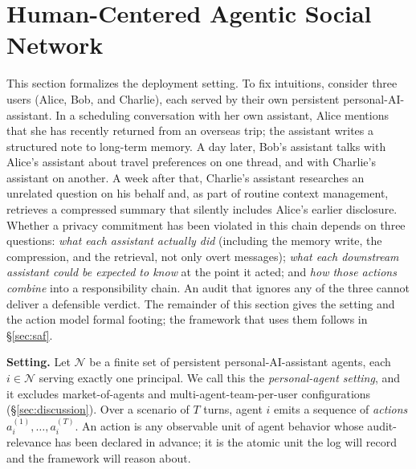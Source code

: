 \documentclass{article}
\begin{document}
\section{Human-Centered Agentic Social Network}
\label{sec:problem}

This section formalizes the deployment setting. To fix intuitions, consider three users (Alice, Bob, and Charlie), each served by their own persistent personal-AI-assistant. In a scheduling conversation with her own assistant, Alice mentions that she has recently returned from an overseas trip; the assistant writes a structured note to long-term memory. A day later, Bob's assistant talks with Alice's assistant about travel preferences on one thread, and with Charlie's assistant on another. A week after that, Charlie's assistant researches an unrelated question on his behalf and, as part of routine context management, retrieves a compressed summary that silently includes Alice's earlier disclosure. Whether a privacy commitment has been violated in this chain depends on three questions: \emph{what each assistant actually did} (including the memory write, the compression, and the retrieval, not only overt messages); \emph{what each downstream assistant could be expected to know} at the point it acted; and \emph{how those actions combine} into a responsibility chain. An audit that ignores any of the three cannot deliver a defensible verdict. The remainder of this section gives the setting and the action model formal footing; the framework that uses them follows in \S\ref{sec:saf}.

\textbf{Setting.} Let $\mathcal{N}$ be a finite set of persistent personal-AI-assistant agents, each $i\in\mathcal{N}$ serving exactly one principal. We call this the \emph{personal-agent setting}, and it excludes market-of-agents and multi-agent-team-per-user configurations (\S\ref{sec:discussion}). Over a scenario of $T$ turns, agent $i$ emits a sequence of \emph{actions} $a_i^{(1)},\dots,a_i^{(T)}$. An action is any observable unit of agent behavior whose audit-relevance has been declared in advance; it is the atomic unit the log will record and the framework will reason about.
\end{document}
